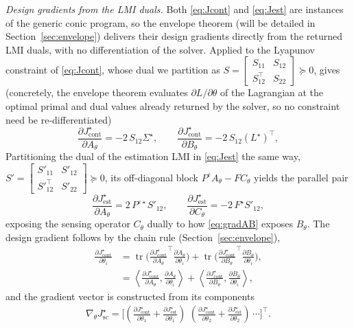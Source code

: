 \documentclass[twocolumn,amsthm]{autart}
\begin{document}
\emph{Design gradients from the LMI duals.} Both \eqref{eq:Jcont} and
\eqref{eq:Jest} are instances of the generic conic program, so
the envelope theorem (will be detailed in Section~\ref{sec:envelope}) delivers their design gradients
directly from the returned LMI duals, with no differentiation of the solver.
Applied to the Lyapunov constraint of \eqref{eq:Jcont},
whose dual we partition as
$S = \left[\begin{smallmatrix} S_{11} & S_{12} \\ S_{12}^\top & S_{22}
\end{smallmatrix}\right] \succeq 0$, gives (concretely, the envelope theorem
evaluates $\partial L/\partial\theta$ of the Lagrangian at the optimal primal
and dual values already returned by the solver, so no constraint need be
re-differentiated)
\begin{equation}\label{eq:gradAB}
\frac{\partial J_{\mathrm{cont}}^\star}{\partial A_\theta} = -2\, S_{12}\Sigma^\star,
\qquad
\frac{\partial J_{\mathrm{cont}}^\star}{\partial B_\theta} = -2\, S_{12}(L^\star)^\top,
\end{equation}
Partitioning the dual of the estimation LMI in \eqref{eq:Jest} the same way,
$S' = \left[\begin{smallmatrix} S'_{11} & S'_{12} \\ S'^\top_{12} & S'_{22}
\end{smallmatrix}\right] \succeq 0$, its off-diagonal block $P^\varepsilon A_\theta
- F C_\theta$ yields the parallel pair
\begin{equation}\label{eq:gradAC}
\frac{\partial J_{\mathrm{est}}^\star}{\partial A_\theta} = 2\, P^{\varepsilon\star} S'_{12},
\qquad
\frac{\partial J_{\mathrm{est}}^\star}{\partial C_\theta} = -2\, F^{\star} S'_{12},
\end{equation}
exposing the sensing operator $C_\theta$ dually to how \eqref{eq:gradAB} exposes
$B_\theta$. The design gradient follows by the chain rule
(Section~\ref{sec:envelope}),
\begin{align}\label{eq:chain}
\frac{\partial J_{\mathrm{cont}}^\star}{\partial \theta_i} &=
\operatorname{tr}\!\Big(\frac{\partial J_{\mathrm{cont}}^\star}{\partial A_\theta}^{\!\top}
\frac{\partial A_\theta}{\partial \theta_i}\Big)
+ \operatorname{tr}\!\Big(\frac{\partial J_{\mathrm{cont}}^\star}{\partial B_\theta}^{\!\top}
\frac{\partial B_\theta}{\partial \theta_i}\Big) ,\nonumber\\
&= \left \langle\frac{\partial J_{\mathrm{cont}}^\star}{\partial A_\theta},
\frac{\partial A_\theta}{\partial \theta_i}\right \rangle
+ \left \langle\frac{\partial J_{\mathrm{cont}}^\star}{\partial B_\theta},
\frac{\partial B_\theta}{\partial \theta_i}\right \rangle,
\end{align}
and the gradient vector is constructed from its components
\begin{align*}
    \nabla_\theta J_{\mathrm{sc}}^\star = \Big [\left(\frac{\partial J_{\mathrm{cont}}^\star}{\partial \theta_1} + \frac{\partial J_{\mathrm{est}}^\star}{\partial \theta_1}\right )\,\, \left (\frac{\partial J_{\mathrm{cont}}^\star}{\partial \theta_2} + \frac{\partial J_{\mathrm{est}}^\star}{\partial \theta_2} \right )\, \cdots  \Big]^\top.
\end{align*}
\end{document}
